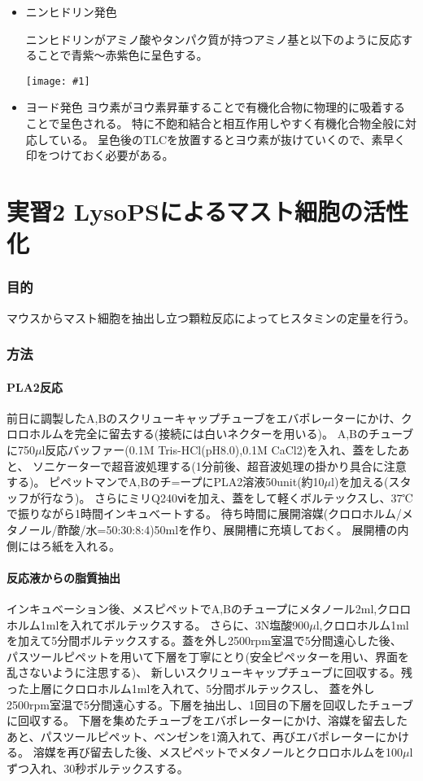 \documentclass[a4paper,papersize,dvipdfmx]{jsarticle}
\newcommand{\pict}[2]{\begin{center} \texttt{[image: \#1]} \end{center}}   %
\begin{document}
\begin{itemize}
\item ニンヒドリン発色

ニンヒドリンがアミノ酸やタンパク質が持つアミノ基と以下のように反応することで青紫～赤紫色に呈色する。
\pict{images/hanou.png}{6}

\item ヨード発色
ヨウ素がヨウ素昇華することで有機化合物に物理的に吸着することで呈色される。
特に不飽和結合と相互作用しやすく有機化合物全般に対応している。
呈色後のTLCを放置するとヨウ素が抜けていくので、素早く印をつけておく必要がある。


\end{itemize}
\part*{実習2 LysoPSによるマスト細胞の活性化}

\section*{目的}
マウスからマスト細胞を抽出し立つ顆粒反応によってヒスタミンの定量を行う。

\section*{方法}
\subsection*{PLA2反応}

前日に調製したA,Bのスクリューキャップチューブをエバポレーターにかけ、クロロホルムを完全に留去する(接続には白いネクターを用いる)。
A,Bのチューブに750$\mu$l反応バッファー(0.1M Tris-HCl(pH8.0),0.1M CaCl2)を入れ、蓋をしたあと、
ソニケーターで超音波処理する(1分前後、超音波処理の掛かり具合に注意する)。
ピペットマンでA,Bのチ=ープにPLA2溶液50unit(約10$\mu$l)を加える(スタッフが行なう)。
さらにミリQ240ⅵを加え、蓋をして軽くボルテックスし、37℃で振りながら1時間インキュべートする。
待ち時間に展開溶媒(クロロホルム/メタノール/酢酸/水=50:30:8:4)50mlを作り、展開槽に充填しておく。
展開槽の内側にはろ紙を入れる。

\subsection*{反応液からの脂質抽出}

インキュべーション後、メスピペットでA,Bのチュープにメタノール2ml,クロロホルム1mlを入れてボルテックスする。
さらに、3N塩酸900$\mu$l,クロロホルム1mlを加えて5分間ボルテックスする。蓋を外し2500rpm室温で5分間遠心した後、
パスツールピペットを用いて下層を丁寧にとり(安全ピペッターを用い、界面を乱さないように注思する)、
新しいスクリューキャップチューブに回収する。残った上層にクロロホルム1mlを入れて、5分間ボルテックスし、
蓋を外し2500rpm室温で5分間遠心する。下層を抽出し、1回目の下層を回収したチューブに回収する。
下層を集めたチューブをエバポレーターにかけ、溶媒を留去したあと、パスツールピペット、べンゼンを1滴入れて、再びエバポレーターにかける。
溶媒を再び留去した後、メスピペットでメタノールとクロロホルムを100$\mu$lずつ入れ、30秒ボルテックスする。
\end{document}
